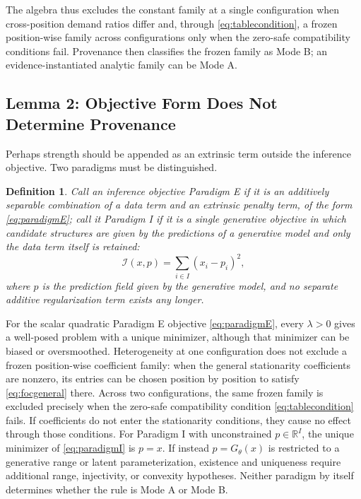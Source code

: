 \documentclass[twoside,11pt]{article}
\newtheorem{defn}{Definition}
\begin{document}
The algebra thus excludes the constant family at a single configuration when cross-position demand ratios differ and, through \eqref{eq:tablecondition}, a frozen position-wise family across configurations only when the zero-safe compatibility conditions fail. Provenance then classifies the frozen family as Mode B; an evidence-instantiated analytic family can be Mode A.

\subsection{Lemma 2: Objective Form Does Not Determine Provenance}

Perhaps strength should be appended as an extrinsic term outside the inference objective. Two paradigms must be distinguished.

\begin{defn}
Call an inference objective \emph{Paradigm E} if it is an additively separable combination of a data term and an extrinsic penalty term, of the form \eqref{eq:paradigmE}; call it \emph{Paradigm I} if it is a single generative objective in which candidate structures are given by the predictions of a generative model and only the data term itself is retained:
\begin{equation}
\mathcal{I}(x, p) = \sum_{i \in I} (x_i - p_i)^2 ,
\label{eq:paradigmI}%
\end{equation}%
where $p$ is the prediction field given by the generative model, and no separate additive regularization term exists any longer.
\end{defn}

\begin{lemma}
For the scalar quadratic Paradigm E objective \eqref{eq:paradigmE}, every $\lambda>0$ gives a well-posed problem with a unique minimizer, although that minimizer can be biased or oversmoothed. Heterogeneity at one configuration does not exclude a frozen position-wise coefficient family: when the general stationarity coefficients are nonzero, its entries can be chosen position by position to satisfy \eqref{eq:focgeneral} there. Across two configurations, the same frozen family is excluded precisely when the zero-safe compatibility condition \eqref{eq:tablecondition} fails. If coefficients do not enter the stationarity conditions, they cause no effect through those conditions. For Paradigm I with unconstrained $p\in\mathbb{R}^{I}$, the unique minimizer of \eqref{eq:paradigmI} is $p=x$. If instead $p=G_{\theta}(x)$ is restricted to a generative range or latent parameterization, existence and uniqueness require additional range, injectivity, or convexity hypotheses. Neither paradigm by itself determines whether the rule is Mode A or Mode B.
\end{lemma}
\end{document}
